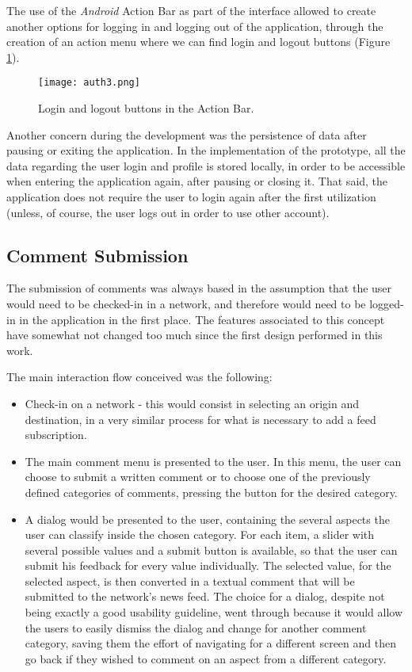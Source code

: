 The use of the \emph{Android} Action Bar as part of the interface allowed to create another options for logging in and logging out of the application, through the creation of an action menu where we can find login and logout buttons (Figure \ref{fig:auth3}).

\begin{figure}[h!]
  \begin{center}
    \leavevmode
    \texttt{[image: auth3.png]}
    \caption{Login and logout buttons in the Action Bar.}
    \label{fig:auth3}
  \end{center}
\end{figure}

Another concern during the development was the persistence of data after pausing or exiting the application. In the implementation of the prototype, all the data regarding the user login and profile is stored locally, in order to be accessible when entering the application again, after pausing or closing it. That said, the application does not require the user to login again after the first utilization (unless, of course, the user logs out in order to use other account).

\subsection{Comment Submission}\label{comment}

The submission of comments was always based in the assumption that the user would need to be checked-in in a network, and therefore would need to be logged-in in the application in the first place. 
The features associated to this concept have somewhat not changed too much since the first design performed in this work.

The main interaction flow conceived was the following:

\begin{itemize}
\item Check-in on a network - this would consist in selecting an origin and destination, in a very similar process for what is necessary to add a feed subscription.
\item The main comment menu is presented to the user. In this menu, the user can choose to submit a written comment or to choose one of the previously defined categories of comments, pressing the button for the desired category.
\item A dialog would be presented to the user, containing the several aspects the user can classify inside the chosen category. For each item, a slider with several possible values and a submit button is available, so that the user can submit his feedback for every value individually. The selected value, for the selected aspect, is then converted in a textual comment that will be submitted to the network's news feed. The choice for a dialog, despite not being exactly a good usability guideline, went through because it would allow the users to easily dismiss the dialog and change for another comment category, saving them the effort of navigating for a different screen and then go back if they wished to comment on an aspect from a different category.
\end{itemize}


